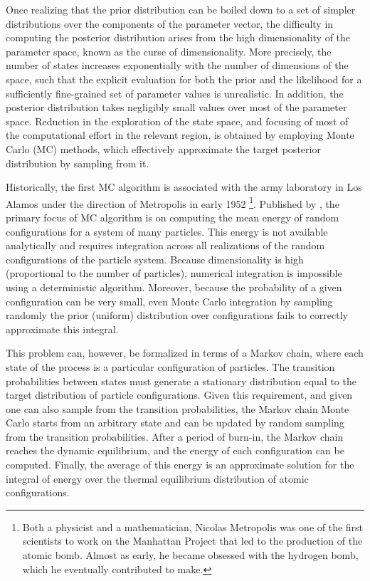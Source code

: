Once realizing that the prior distribution can be boiled down to a set of simpler distributions over the components of the parameter vector, the difficulty in computing the posterior distribution arises from the high dimensionality of the parameter space, known as the curse of dimensionality.
More precisely, the number of states increases exponentially with the number of dimensions of the space, such that the explicit evaluation for both the prior and the likelihood for a sufficiently fine-grained set of parameter values is unrealistic.
In addition, the posterior distribution takes negligibly small values over most of the parameter space.
Reduction in the exploration of the state space, and focusing of most of the computational effort in the relevant region, is obtained by employing Monte Carlo (\acrshort{MC}) methods, which effectively approximate the target posterior distribution by sampling from it.

Historically, the first \acrshort{MC} algorithm is associated with the army laboratory in Los Alamos under the direction of Metropolis in early 1952
\footnote{Both a physicist and a mathematician, Nicolas Metropolis was one of the first scientists to work on the Manhattan Project that led to the production of the atomic bomb. Almost as early, he became obsessed with the hydrogen bomb, which he eventually contributed to make.}.
Published by \citet{Metropolis1953}, the primary focus of \acrshort{MC} algorithm is on computing the mean energy of random configurations for a system of many particles.
This energy is not available analytically and requires integration across all realizations of the random configurations of the particle system.
Because dimensionality is high (proportional to the number of particles), numerical integration is impossible using a deterministic algorithm.
Moreover, because the probability of a given configuration can be very small, even Monte Carlo integration by sampling randomly the prior (uniform) distribution over configurations fails to correctly approximate this integral.

This problem can, however, be formalized in terms of a Markov chain, where each state of the process is a particular configuration of particles.
The transition probabilities between states must generate a stationary distribution equal to the target distribution of particle configurations.
Given this requirement, and given one can also sample from the transition probabilities, the Markov chain Monte Carlo starts from an arbitrary state and can be updated by random sampling from the transition probabilities.
After a period of burn-in, the Markov chain reaches the dynamic equilibrium, and the energy of each configuration can be computed.
Finally, the average of this energy is an approximate solution for the integral of energy over the thermal equilibrium distribution of atomic configurations.

